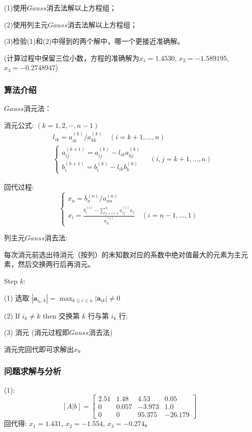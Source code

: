 \documentclass[UTF8]{ctexart}
\begin{document}
(1)使用$Gauss$消去法解以上方程组；

(2)使用列主元$Gauss$消去法解以上方程组；

(3)检验(1)和(2)中得到的两个解中，哪一个更接近准确解。


(计算过程中保留三位小数，方程的准确解为$x_1=1.4530$, $x_2=-1.589195$, $x_3=-0.2748947$)
\subsubsection{算法介绍}
$Gauss$消元法：

消元公式: $(k=1,2, \cdots, n-1)$
$$
    \begin{aligned}
        &l_{i k}=a_{i k}^{(k)} / a_{k k}^{(k)} \quad(i=k+1, \ldots, n) \\
        &\left\{\begin{array}{l}
        a_{i j}^{(k+1)}=a_{i j}^{(k)}-l_{i k} a_{k j}^{(k)} \\
        b_{i}^{(k+1)}=b_{i}^{(k)}-l_{i k} b_{k}^{(k)}
        \end{array} \quad(i, j=k+1, \ldots, n)\right.
        \end{aligned}
$$

回代过程:
$$
    \left\{\begin{array}{l}
        x_{n}=b_{n}^{(n)} / a_{n n}^{(n)} \\
        x_{i}=\frac{b_{i}^{(i)}-\sum_{j=i+1}^{n} a_{i j}^{(i)} x_{j}}{a_{i i}^{(i)}} \quad(i=n-1, \ldots, 1)
        \end{array}\right.
$$

\quad

列主元$Gauss$消去法:

每次消元前选出待消元（按列）的未知数对应的系数中绝对值最大的元素为主元素，然后交换两行后再消元。

Step $k:$ 

(1) 选取 $\left|\boldsymbol{a}_{i_{k}, k}\right|=\max _{k \leq i \leq n}\left|\boldsymbol{a}_{i k}\right| \neq 0$

(2) If $i_{k} \neq k$ then 交换第 $k$ 行与第 $i_{k}$ 行;

(3) 消元 (消元过程即$Gauss$消去法)

消元完回代即可求解出$x$。
\subsubsection{问题求解与分析}
(1):
\begin{equation}\nonumber
    [A|b]=\left[\begin{array}{cccc}
        2.51 & 1.48 & 4.53 & 0.05 \\
        0 & 0.057 & -3.973 & 1.0 \\
        0 & 0 & 95.375 & -26.179
        \end{array}\right]
\end{equation}
回代得: $x_1 = 1.431$, $x_2 = -1.554$, $x_3 = -0.274$。
\end{document}
